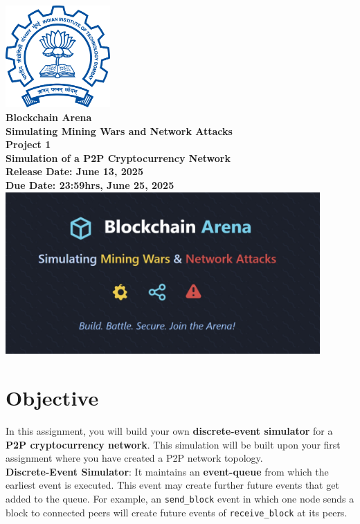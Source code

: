 \documentclass[12pt]{extarticle}
\begin{document}
\begin{titlepage}
    \begin{center}
        \includegraphics[width=0.3\textwidth]{iitb_logo.png}\\[1.5cm]
        {\LARGE \bfseries Blockchain Arena}\\
        \vspace{0.5cm}
        {\Large \bfseries Simulating Mining Wars and Network Attacks}\\
        \vspace{1cm}
        {\LARGE \bfseries Project 1}\\
        \vspace{0.5cm}
        {\Large \bfseries Simulation of a P2P Cryptocurrency Network}\\
        \vspace{1.5cm}
        {\Large \bf Release Date: June 13, 2025}\\
        \vspace{0.5cm}
        {\Large \bf Due Date: 23:59hrs, June 25, 2025}\\
        \vspace{3cm}
        \includegraphics[width=0.9\textwidth]{blockchain_arena.jpeg}\\[1.5cm]
    \end{center}
\end{titlepage}

\section*{Objective}
In this assignment, you will build your own \textbf{discrete-event simulator} for a \textbf{P2P cryptocurrency network}. This simulation will be built upon your first assignment where you have created a P2P network topology.\\
\textbf{Discrete-Event Simulator}: It maintains an \textbf{event-queue} from which the earliest event is executed. This event may create further future events that get added to the queue. For example, an \texttt{send\_block} event in which one node sends a block to connected peers will create future events of \texttt{receive\_block} at its peers.
\end{document}
